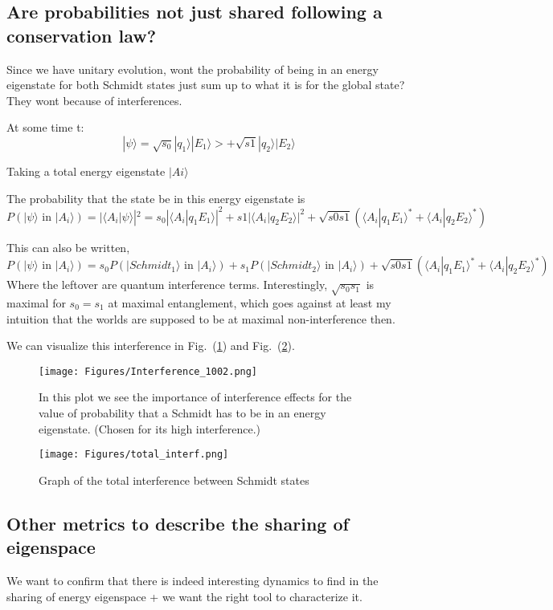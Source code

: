 \documentclass{article}
\begin{document}
\subsection{Are probabilities not just shared following a conservation law?}
Since we have unitary evolution, wont the probability of being in an energy eigenstate for both Schmidt states just sum up to what it is for the global state? They wont because of interferences.

At some time t:
$$|\psi\rangle=\sqrt{s_0}|q_1\rangle|E_1\rangle>+\sqrt{s1}|q_2\rangle|E_2\rangle$$

Taking a total energy eigenstate $|Ai\rangle$

The probability that the state be in this energy eigenstate is 
$$P(|\psi\rangle \text{ in } |A_i\rangle)=|\langle A_i|\psi\rangle|^2 = s_0|\langle A_i|q_1E_1\rangle|^2+s1|\langle A_i|q_2E_2\rangle|^2+\sqrt{s0s1}(\langle A_i|q_1E_1\rangle^*+\langle A_i|q_2E_2\rangle^*)$$

This can also be written,
$$P(|\psi\rangle \text{ in } |A_i\rangle)= s_0P(|Schmidt_1\rangle\text{ in }|A_i\rangle)+ s_1P(|Schmidt_2\rangle\text{ in }|A_i\rangle) +\sqrt{s0s1}(\langle A_i|q_1E_1\rangle^*+\langle A_i|q_2E_2\rangle^*)$$
Where the leftover are quantum interference terms.
Interestingly, $\sqrt{s_0s_1}$ is maximal for $s_0=s_1$ at maximal entanglement, which goes against at least my intuition that the  worlds are supposed to be at maximal non-interference then.

We can visualize this interference in Fig.~(\ref{fig:interf1002}) and Fig.~(\ref{fig:total_interference}).
\begin{figure}[h]
    \centering
    \texttt{[image: Figures/Interference\_1002.png]}
    \caption{In this plot we see the importance of interference effects for the value of probability that a Schmidt has to be in an energy eigenstate. (Chosen for its high interference.)}
    \label{fig:interf1002}
\end{figure}

\begin{figure}[h]
    \centering
    \texttt{[image: Figures/total\_interf.png]}
    \caption{Graph of the total interference between Schmidt states}
    \label{fig:total_interference}
\end{figure}

\newpage

\subsection{Other metrics to describe the sharing of eigenspace}
We want to confirm that there is indeed interesting dynamics to find in the sharing of energy eigenspace + we want the right tool to characterize it.
\end{document}
